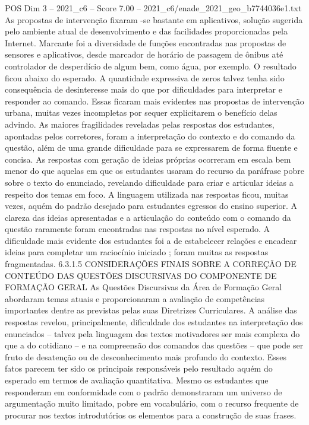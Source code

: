 \begin{textsample}{POS Dim 3 – 2021\_c6 – Score 7.00 – 2021\_c6/enade\_2021\_geo\_b7744036e1.txt}
As propostas de intervenção fixaram -se bastante em aplicativos, solução sugerida pelo ambiente atual de desenvolvimento e das facilidades proporcionadas pela Internet.
Marcante foi a diversidade de funções encontradas nas propostas de sensores e aplicativos, desde marcador de horário de passagem de ônibus até controlador de desperdício de algum bem, como água, por exemplo.
O resultado ficou abaixo do esperado.
A quantidade expressiva de zeros talvez tenha sido consequência de desinteresse mais do que por dificuldades para interpretar e responder ao comando.
Essas ficaram mais evidentes nas propostas de intervenção urbana, muitas vezes incompletas por sequer explicitarem o benefício delas advindo.
As maiores fragilidades reveladas pelas respostas dos estudantes, apontadas pelos corretores, foram a interpretação do contexto e do comando da questão, além de uma grande dificuldade para se expressarem de forma fluente e concisa.
As respostas com geração de ideias próprias ocorreram em escala bem menor do que aquelas em que os estudantes usaram do recurso da paráfrase pobre sobre o texto do enunciado, revelando dificuldade para criar e articular ideias a respeito dos temas em foco.
A linguagem utilizada nas respostas ficou, muitas vezes, aquém do padrão desejado para estudantes egressos do ensino superior.
A clareza das ideias apresentadas e a articulação do conteúdo com o comando da questão raramente foram encontradas nas respostas no nível esperado.
A dificuldade mais evidente dos estudantes foi a de estabelecer relações e encadear ideias para completar um raciocínio iniciado ; foram muitas as respostas fragmentadas. 6.3.1.5 CONSIDERAÇÕES FINAIS SOBRE A CORREÇÃO DE CONTEÚDO DAS QUESTÕES DISCURSIVAS DO COMPONENTE DE FORMAÇÃO GERAL As Questões Discursivas da Área de Formação Geral abordaram temas atuais e proporcionaram a avaliação de competências importantes dentre as previstas pelas suas Diretrizes Curriculares.
A análise das respostas revelou, principalmente, dificuldade dos estudantes na interpretação dos enunciados – talvez pela linguagem dos textos motivadores ser mais complexa do que a do cotidiano – e na compreensão dos comandos das questões – que pode ser fruto de desatenção ou de desconhecimento mais profundo do contexto.
Esses fatos parecem ter sido os principais responsáveis pelo resultado aquém do esperado em termos de avaliação quantitativa.
Mesmo os estudantes que responderam em conformidade com o padrão demonstraram um universo de argumentação muito limitado, pobre em vocabulário, com o recurso frequente de procurar nos textos introdutórios os elementos para a construção de suas frases.

\end{textsample}
